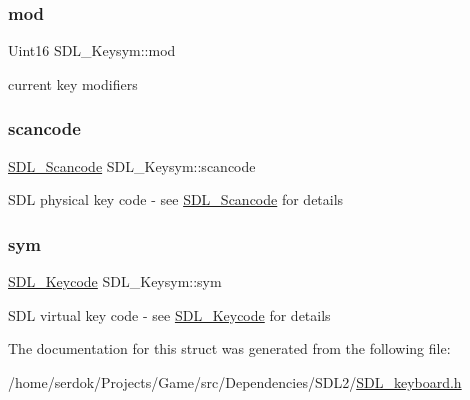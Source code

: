 \subsubsection{\texorpdfstring{mod}{mod}}
{\footnotesize\ttfamily Uint16 S\+D\+L\+\_\+\+Keysym\+::mod}

current key modifiers \mbox{\label{structSDL__Keysym_ad47e9120a511e2efc7ec0c6d8a5ec51e}} 
\subsubsection{\texorpdfstring{scancode}{scancode}}
{\footnotesize\ttfamily \hyperlink{SDL__scancode_8h_a82ab7cff701034fb40a47b5b3a02777b}{S\+D\+L\+\_\+\+Scancode} S\+D\+L\+\_\+\+Keysym\+::scancode}

S\+DL physical key code -\/ see \hyperlink{SDL__scancode_8h_a82ab7cff701034fb40a47b5b3a02777b}{S\+D\+L\+\_\+\+Scancode} for details \mbox{\label{structSDL__Keysym_a082ff1fd787b79fa6c3a445deb225f08}} 
\subsubsection{\texorpdfstring{sym}{sym}}
{\footnotesize\ttfamily \hyperlink{SDL__keycode_8h_ae9265f064f13f0f74dfca26a67875171}{S\+D\+L\+\_\+\+Keycode} S\+D\+L\+\_\+\+Keysym\+::sym}

S\+DL virtual key code -\/ see \hyperlink{SDL__keycode_8h_ae9265f064f13f0f74dfca26a67875171}{S\+D\+L\+\_\+\+Keycode} for details 

The documentation for this struct was generated from the following file\+:\begin{DoxyCompactItemize}
\item 
/home/serdok/\+Projects/\+Game/src/\+Dependencies/\+S\+D\+L2/\hyperlink{SDL__keyboard_8h}{S\+D\+L\+\_\+keyboard.\+h}\end{DoxyCompactItemize}
